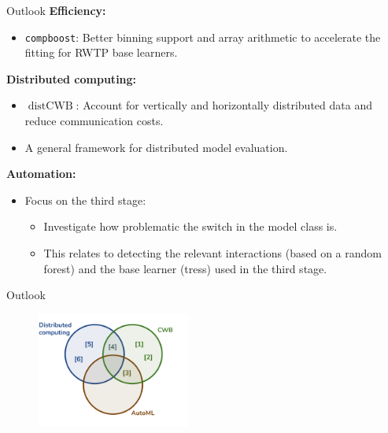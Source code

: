\documentclass[t,10pt]{beamer}
\begin{document}
\begin{frame}{Outlook}
    \textbf{Efficiency:}
    \begin{itemize}
        \item 
            \texttt{compboost}: Better binning support and array arithmetic to accelerate the fitting for RWTP base learners.
    \end{itemize}
    \textbf{Distributed computing:}
    \begin{itemize}
        \item 
            $\operatorname{distCWB}$: Account for vertically and horizontally distributed data and reduce communication costs.
        \item
            A general framework for distributed model evaluation. 
    \end{itemize}
    \textbf{Automation:}
    \begin{itemize}
        \item 
            Focus on the third stage: 
            \begin{itemize}
                \item Investigate how problematic the switch in the model class is.
                \item This relates to detecting the relevant interactions (based on a random forest) and the base learner (tress) used in the third stage. 
            \end{itemize}
    \end{itemize}
\end{frame}


\begin{frame}{Outlook}
  \begin{figure}
    \centering
    \includegraphics[width=0.45\textwidth]{figures/topics.png}
  \end{figure}
\end{frame}
\end{document}
